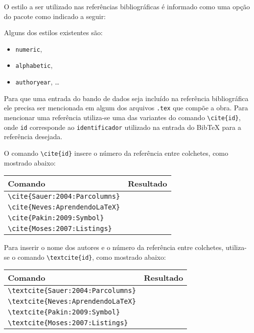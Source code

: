 O estilo a ser utilizado nas referências bibliográficas é informado como uma
opção do pacote  como indicado a seguir:
\begin{code}
\usepackage[style=estilo]{biblatex}
\end{code}
Alguns dos estilos existentes são:
\begin{itemize}
  \item \lstinline+numeric+,
  \item \lstinline+alphabetic+,
  \item \lstinline+authoryear+, \dots
\end{itemize}

Para que uma entrada do bando de dados seja incluído na referência bibliográfica
ele precisa ser mencionada em algum dos arquivos \lstinline+.tex+ que compõe a
obra. Para mencionar uma referência utiliza-se uma das variantes do comando
\lstinline+\cite{id}+, onde \lstinline+id+ corresponde ao
\lstinline+identificador+ utilizado na entrada do BibTeX para a referência
desejada.

O comando \lstinline+\cite{id}+ insere o número da referência entre colchetes,
como mostrado abaixo:
\begin{table}[!h]
  \centering
  \begin{tabular}{lc}
    \hline
    Comando & Resultado \\ \hline
    \lstinline+\cite{Sauer:2004:Parcolumns}+ & \cite{Sauer:2004:Parcolumns} \\
    \lstinline+\cite{Neves:AprendendoLaTeX}+ & \cite{Neves:AprendendoLaTeX} \\
    \lstinline+\cite{Pakin:2009:Symbol}+ & \cite{Pakin:2009:Symbol} \\
    \lstinline+\cite{Moses:2007:Listings}+ & \cite{Moses:2007:Listings} \\ \hline
  \end{tabular}
\end{table}

Para inserir o nome dos autores e o número da referência entre colchetes,
utiliza-se o comando \lstinline+\textcite{id}+, como mostrado abaixo:
\begin{table}[!h]
  \centering
  \begin{tabular}{ll}
    \hline
    Comando & Resultado \\ \hline
    \lstinline+\textcite{Sauer:2004:Parcolumns}+ & \textcite{Sauer:2004:Parcolumns} \\
    \lstinline+\textcite{Neves:AprendendoLaTeX}+ & \textcite{Neves:AprendendoLaTeX} \\
    \lstinline+\textcite{Pakin:2009:Symbol}+ & \textcite{Pakin:2009:Symbol} \\
    \lstinline+\textcite{Moses:2007:Listings}+ & \textcite{Moses:2007:Listings} \\ \hline
  \end{tabular}
\end{table}

